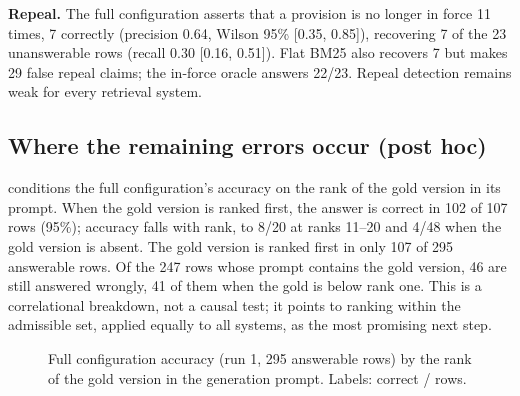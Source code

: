 \documentclass[conference]{IEEEtran}
\begin{document}
\textbf{Repeal.} The full configuration asserts that a provision is no longer in force 11 times, 7 correctly (precision 0.64, Wilson 95\% [0.35, 0.85]), recovering 7 of the 23 unanswerable rows (recall 0.30 [0.16, 0.51]). Flat BM25 also recovers 7 but makes 29 false repeal claims; the in-force oracle answers 22/23. Repeal detection remains weak for every retrieval system.

\subsection{Where the remaining errors occur (post hoc)}

 conditions the full configuration's accuracy on the rank of the gold version in its prompt. When the gold version is ranked first, the answer is correct in 102 of 107 rows (95\%); accuracy falls with rank, to 8/20 at ranks 11--20 and 4/48 when the gold version is absent. The gold version is ranked first in only 107 of 295 answerable rows. Of the 247 rows whose prompt contains the gold version, 46 are still answered wrongly, 41 of them when the gold is below rank one. This is a correlational breakdown, not a causal test; it points to ranking within the admissible set, applied equally to all systems, as the most promising next step.

\begin{figure}[t]
\centering
{}
\caption{Full configuration accuracy (run 1, 295 answerable rows) by the rank of the gold version in the generation prompt. Labels: correct / rows.}
\label{fig:rank}
\end{figure}
\end{document}
